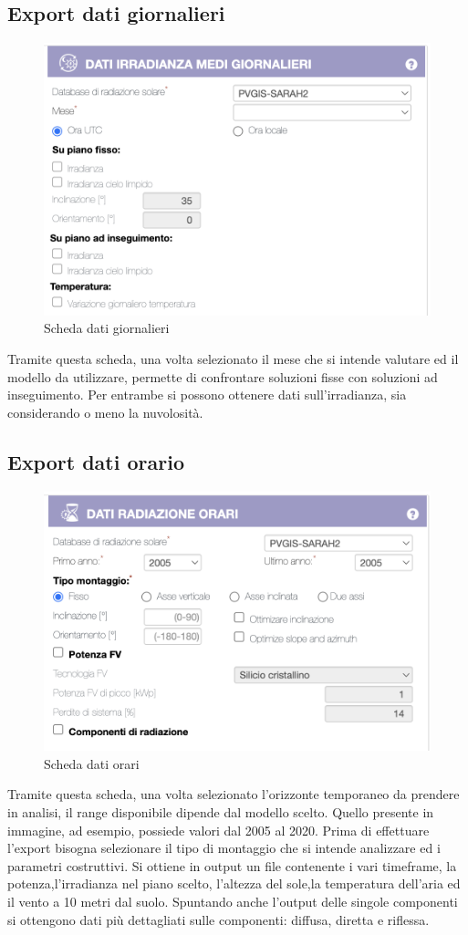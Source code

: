 \subsection{Export dati giornalieri}
\begin{figure}[H]
    \centering
    \includegraphics[height=0.5\textwidth]{res/cap 4/dati giornalieri}
    \caption{Scheda dati giornalieri}
\end{figure}\noindent
Tramite questa scheda, una volta selezionato il mese che si intende valutare ed il modello da utilizzare, permette di confrontare soluzioni fisse con soluzioni ad inseguimento. Per entrambe si possono ottenere dati sull'irradianza, sia considerando o meno la nuvolosità.
\subsection{Export dati orario}
\label{subsec:export orario}
\begin{figure}[H]
    \centering
    \includegraphics[height=0.5\textwidth]{res/cap 4/dati orari}
    \caption{Scheda dati orari}
\end{figure}\noindent
Tramite questa scheda, una volta selezionato l'orizzonte temporaneo da prendere in analisi, il range disponibile dipende dal modello scelto. Quello presente in immagine, ad esempio, possiede valori dal 2005 al 2020.
Prima di effettuare l'export bisogna selezionare il tipo di montaggio che si intende analizzare ed i parametri costruttivi.
Si ottiene in output un file contenente i vari timeframe, la potenza,l'irradianza nel piano scelto, l'altezza del sole,la temperatura dell'aria ed il vento a 10 metri dal suolo.
Spuntando anche l'output delle singole componenti si ottengono dati più dettagliati sulle componenti: diffusa, diretta e riflessa.
